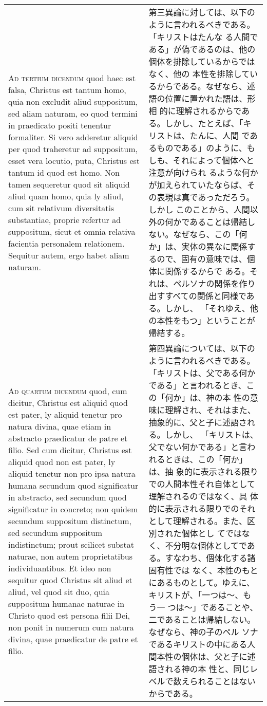 \documentclass[10pt]{jsarticle} %
\begin{document}
\begin{longtable}{p{21em}p{21em}}
\\


{\scshape Ad tertium dicendum} quod haec est falsa, Christus est
tantum homo, quia non excludit aliud suppositum, sed aliam naturam, eo
quod termini in praedicato positi tenentur formaliter. Si vero
adderetur aliquid per quod traheretur ad suppositum, esset vera
locutio, puta, Christus est tantum id quod est homo. Non tamen
sequeretur quod sit aliquid aliud quam homo, quia ly aliud, cum sit
relativum diversitatis substantiae, proprie refertur ad suppositum,
sicut et omnia relativa facientia personalem relationem. Sequitur
autem, ergo habet aliam naturam.


&

第三異論に対しては、以下のように言われるべきである。「キリストはたんな
る人間である」が偽であるのは、他の個体を排除しているからではなく、他の
本性を排除しているからである。なぜなら、述語の位置に置かれた語は、形相
的に理解されるからである。しかし、たとえば、「キリストは、たんに、人間
であるものである」のように、もしも、それによって個体へと注意が向けられ
るような何かが加えられていたならば、その表現は真であっただろう。しかし
このことから、人間以外の何かであることは帰結しない。なぜなら、この「何
か」は、実体の異なに関係するので、固有の意味では、個体に関係するからで
ある。それは、ペルソナの関係を作り出すすべての関係と同様である。しかし、
「それゆえ、他の本性をもつ」ということが帰結する。


\\


{\scshape Ad quartum dicendum} quod, cum dicitur,
 Christus est aliquid quod est pater, ly aliquid tenetur pro natura
 divina, quae etiam in abstracto praedicatur de patre et filio. Sed cum
 dicitur, Christus est aliquid quod non est pater, ly aliquid tenetur
 non pro ipsa natura humana secundum quod significatur in abstracto, sed
 secundum quod significatur in concreto; non quidem secundum suppositum
 distinctum, sed secundum suppositum indistinctum; prout scilicet
 substat naturae, non autem proprietatibus individuantibus. Et ideo non
 sequitur quod Christus sit aliud et aliud, vel quod sit duo, quia
 suppositum humanae naturae in Christo quod est persona filii Dei, non
 ponit in numerum cum natura divina, quae praedicatur de patre et filio.


&

第四異論については、以下のように言われるべきである。
「キリストは、父である何かである」と言われるとき、この「何か」は、神の本
 性の意味に理解され、それはまた、抽象的に、父と子に述語される。しかし、
 「キリストは、父でない何かである」と言われるときは、この「何か」は、抽
 象的に表示される限りでの人間本性それ自体として理解されるのではなく、具
 体的に表示される限りでのそれとして理解される。また、区別された個体とし
 てではなく、不分明な個体としてである。すなわち、個体化する諸固有性では
 なく、本性のもとにあるものとして。ゆえに、キリストが、「一つは〜、もう一
 つは〜」であることや、二であることは帰結しない。なぜなら、神の子のペル
 ソナであるキリストの中にある人間本性の個体は、父と子に述語される神の本
 性と、同じレベルで数えられることはないからである。


\end{longtable}
\end{document}
